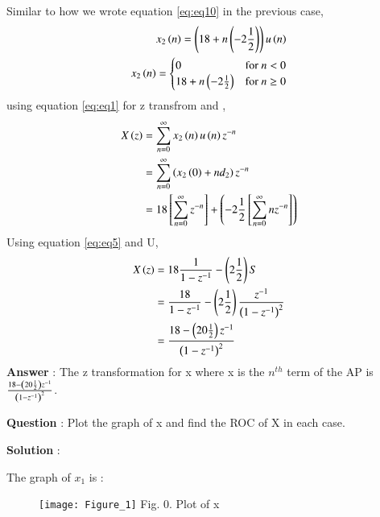 \documentclass[journal,12pt,twocolumn]{IEEEtran}
\theoremstyle{remark}
\begin{document}
Similar to how we wrote equation \eqref{eq:eq10} in the previous case, 
\begin{align}
&x_{2}\left(n\right) = \left(18 + n\left(-2\frac{1}{2}\right)\right)u\left(n\right) \\
     x_{2}\left(n\right) & = \begin{cases}
        0 & \text{for } n < 0 \\
        18 + n\left(-2\frac{1}{2}\right) & \text{for } n \geq 0
    \end{cases}
\end{align}
using equation \eqref{eq:eq1} for z transfrom and ,\\
\begin{align}
X\left(z\right) &= \sum_{n=0}^{\infty}x_{2}\left(n\right)u\left(n\right)z^{-n}\\
 &= \sum_{n=0}^{\infty}\left(x_{2}\left(0\right) + nd_{2}\right)z^{-n} \\
 &=  18{}\left[\sum_{n=0}^{\infty}z^{-n}\right] + \left(-2\frac{1}{2}{}\left[\sum_{n=0}^{\infty}nz^{-n}\right]\right) \label{eq:eq8}
 \end{align}
 Using equation \eqref{eq:eq5} and U,
 \begin{align} 
 X\left(z\right) &= 18\frac{1}{1-z^{-1}} - \left(2\frac{1}{2}\right)S\\
&=  \frac{18}{1 - z^{-1}} - \left(2\frac{1}{2}\right)\frac{z^{-1}}{\left(1-z^{-1}\right)^2}\\
&= \frac{18 - \left(20\frac{1}{2}\right)z^{-1}}{\left(1 - z^{-1}\right)^2}
\end{align}
\large\textbf{Answer} : \normalsize The z transformation for x where x is the $n^{th}$ term of the AP is $\frac{18 - \left(20\frac{1}{2}\right)z^{-1}}{\left(1 - z^{-1}\right)^2}$.

\vspace{4mm}

\large\textbf{Question} : \normalsize Plot the graph of x and find the ROC of X in each case.

\vspace{4mm}
\large\textbf{Solution} :

\vspace{4mm}

\large\textbf{} \normalsize The graph of $x_{1}$ is :
\begin{figure}[ht]
    \begin{center}
    \texttt{[image: Figure\_1]}
    Fig. 0. Plot of x \\
    \end{center}
\end{figure}
\end{document}
